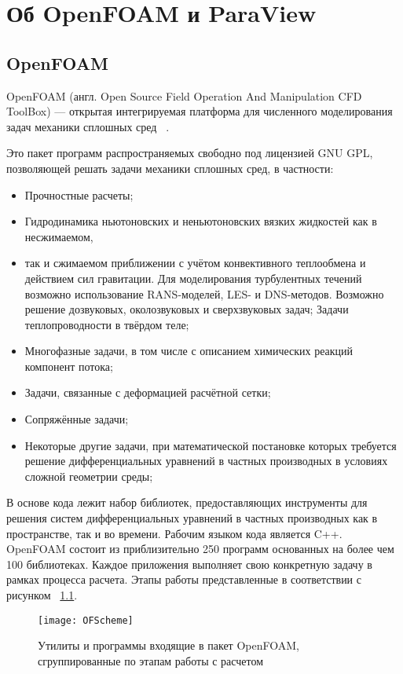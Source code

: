\documentclass[14pt]{extreport}
\begin{document}
\chapter{Об OpenFOAM и ParaView}
\section{OpenFOAM}
OpenFOAM (англ. Open Source Field Operation And Manipulation CFD ToolBox) — открытая интегрируемая платформа для численного моделирования задач механики сплошных сред ~\cite{OpenfoamWiki}.

Это пакет программ распространяемых свободно под лицензией GNU GPL, позволяющей решать задачи механики сплошных сред, в частности: 
\begin{itemize}
\item Прочностные расчеты;
\item Гидродинамика ньютоновских и неньютоновских вязких жидкостей как в несжимаемом, \item так и сжимаемом приближении с учётом конвективного теплообмена и действием сил гравитации. Для моделирования турбулентных течений возможно использование RANS-моделей, LES- и DNS-методов. Возможно решение дозвуковых, околозвуковых и сверхзвуковых задач;
Задачи теплопроводности в твёрдом теле;
\item Многофазные задачи, в том числе с описанием химических реакций компонент потока;
\item Задачи, связанные с деформацией расчётной сетки;
\item Сопряжённые задачи;
\item Некоторые другие задачи, при математической постановке которых требуется решение дифференциальных уравнений в частных производных в условиях сложной геометрии среды;
\end{itemize}

В основе кода лежит набор библиотек, предоставляющих инструменты для решения систем дифференциальных уравнений в частных производных как в пространстве, так и во времени. Рабочим языком кода является C++. OpenFOAM состоит из приблизительно 250 программ основанных на более чем 100 библиотеках. Каждое приложения выполняет свою конкретную задачу в рамках процесса расчета. Этапы работы представленные в соответствии с рисунком ~\ref{fig1}.

\begin{figure}[H]
\centerline{\texttt{[image: OFScheme]}}
\caption{Утилиты и программы входящие в пакет OpenFOAM, сгруппированные по этапам работы с расчетом}
\label{fig1}
\end{figure}
\end{document}
